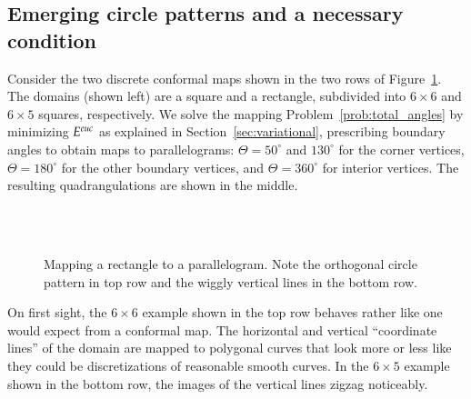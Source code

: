 \documentclass[Thesis]{subfiles}
\begin{document}
\subsection{Emerging circle patterns and a necessary condition}
\label{sec:schramm_and_condition}

Consider the two discrete conformal maps shown in the two rows of
Figure~\ref{fig:cyclic_parallelogram}. The domains (shown left) are a
square and a rectangle, subdivided into $6\times 6$ and $6\times 5$
squares, respectively.  We solve the mapping
Problem~\ref{prob:total_angles} by minimizing $E^{\euc}$ as explained
in Section~\ref{sec:variational}, prescribing boundary angles to
obtain maps to parallelograms: $\Theta=50^{\circ}$ and $130^{\circ}$
for the corner vertices, $\Theta=180^{\circ}$ for the other boundary
vertices, and $\Theta=360^{\circ}$ for interior vertices. The
resulting quadrangulations are shown in the middle. 
\begin{figure}
\centering
{}\hfill%
\hspace{-0.05\textwidth}%
\\
\hfill%
\hspace{-0.05\textwidth}%
\\
%
\caption{
Mapping a rectangle to a parallelogram. Note the orthogonal circle
pattern in top row and the wiggly vertical lines
in the bottom row. 
}
\label{fig:cyclic_parallelogram}
\end{figure}


On first sight, the $6\times 6$ example shown in the top row behaves
rather like one would expect from a conformal map. The horizontal and
vertical ``coordinate lines'' of the domain are mapped to polygonal
curves that look more or less like they could be discretizations of
reasonable smooth curves. In the $6\times 5$ example shown in the
bottom row, the images of the vertical lines zigzag noticeably.
\end{document}
